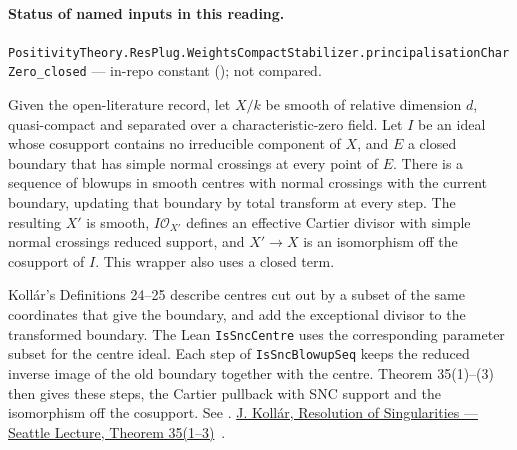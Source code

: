 

\paragraph{Status of named inputs in this reading.}
\noindent\nolinkurl{PositivityTheory.ResPlug.WeightsCompactStabilizer.principalisationCharZero_closed} --- in-repo constant (); not compared.\par

\begin{formalstatement}\label{sub:T20}

Given the open-literature record, let $X/k$ be smooth of relative
dimension $d$, quasi-compact and separated over a characteristic-zero
field. Let $I$ be an ideal whose cosupport contains no irreducible
component of $X$, and $E$ a closed boundary that has simple normal
crossings at every point of $E$. There is a sequence of blowups in
smooth centres with normal crossings with the current boundary,
updating that boundary by total transform at every step. The resulting
$X'$ is smooth, $I\mathcal O_{X'}$ defines an effective Cartier divisor
with simple normal crossings reduced support, and $X'\to X$ is an
isomorphism off the cosupport of $I$. This wrapper also uses a closed term.

\end{formalstatement}

\noindent Kollár's Definitions 24--25 describe centres cut out by a subset of the same coordinates that give the boundary, and add the exceptional divisor to the transformed boundary. The Lean \nolinkurl{IsSncCentre} uses the corresponding parameter subset for the centre ideal. Each step of \nolinkurl{IsSncBlowupSeq} keeps the reduced inverse image of the old boundary together with the centre. Theorem 35(1)--(3) then gives these steps, the Cartier pullback with SNC support and the isomorphism off the cosupport. See . \href{https://arxiv.org/pdf/math/0508332}{J. Kollár, Resolution of Singularities — Seattle Lecture, Theorem 35(1–3)}~\cite{r21-kollar}.

